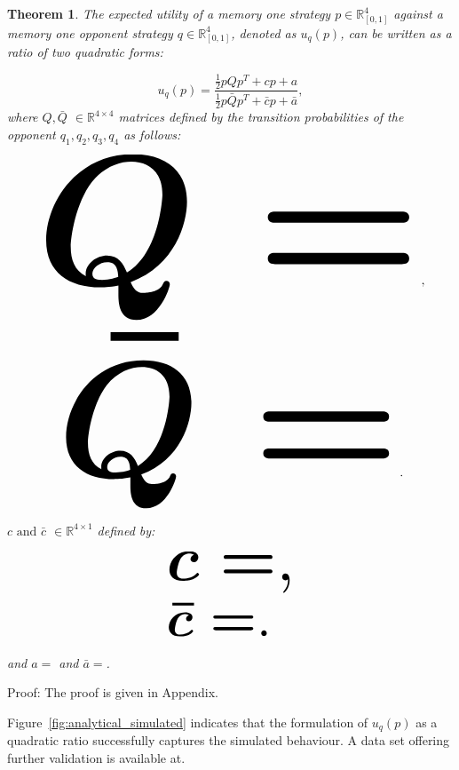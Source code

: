 \documentclass[10pt]{article}
\newcommand{\R}{\mathbb{R}}
\newtheorem{theorem}{Theorem}
\begin{document}
\begin{theorem}\label{theorem:quadratic_form_u}
    The expected utility of a memory one strategy \(p\in\mathbb{R}_{[0,1]}^4\)
    against a memory one opponent strategy \(q\in\mathbb{R}_{[0,1]}^4\), denoted
    as \(u_q(p)\), can be written as a ratio of two quadratic forms:

    \begin{equation}\label{eq:optimisation_quadratic}
    u_q(p) = \frac{\frac{1}{2}pQp^T + cp + a}
                {\frac{1}{2}p\bar{Q}p^T + \bar{c}p + \bar{a}},
    \end{equation}
    where \(Q, \bar{Q}\) \(\in \R^{4\times4}\) matrices defined by the transition
    probabilities of the opponent \(q_1, q_2, q_3, q_4\) as follows:

    \begin{center}
    \begin{equation}
    \resizebox{0.9\linewidth}{!}{\arraycolsep=2.5pt%
    \boldmath\(
    Q = \)},
    \end{equation}
    \begin{equation}\label{eq:q_bar_matrix}
    \resizebox{0.8\linewidth}{!}{\arraycolsep=2.5pt%
    \boldmath\(
    \bar{Q} =  \)}.
    \end{equation}
    \end{center}

    \(c \text{ and } \bar{c}\) \(\in \R^{4 \times 1}\) defined by:

    \begin{equation}\label{eq:q_matrix_numerator}
    \resizebox{0.3\linewidth}{!}{\arraycolsep=2.5pt%
    \boldmath\(c = \),}
    \end{equation}
    \begin{equation}\label{eq:q_matrix_denominator}
    \resizebox{0.3\linewidth}{!}{\arraycolsep=2.5pt%
    \boldmath\(\bar{c} = \).
    }
    \end{equation}

    and \(a = \) and
    \(\bar{a} = \).
\end{theorem}

Proof: The proof is given in Appendix. %

Figure~\ref{fig:analytical_simulated} indicates that the  formulation of \(u_q(p)\)
as a quadratic ratio successfully captures the simulated behaviour. A data set
offering further validation is available at. %
\end{document}
